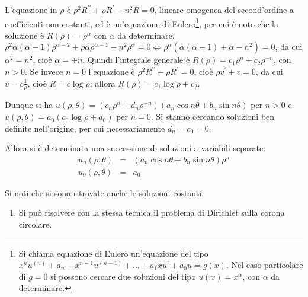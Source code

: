 \documentclass{article}
\begin{document}
L'equazione in $\rho $ \`{e} $\rho ^{2}R^{\prime \prime }+\rho R^{\prime
}-n^{2}R=0$, lineare omogenea del second'ordine a coefficienti non costanti,
ed \`{e} un'equazione di Eulero\footnote{%
Si chiama equazione di Eulero un'equazione del tipo $x^{n}u^{\left( n\right)
}+a_{n-1}x^{n-1}u^{\left( n-1\right) }+...+a_{1}xu^{\prime }+a_{0}u=g\left(
x\right) $. Nel caso particolare di $g=0$ si possono cercare due soluzioni
del tipo $u\left( x\right) =x^{\alpha }$, con $\alpha $ da determinare.},
per cui \`{e} noto che la soluzione \`{e} $R\left( \rho \right) =\rho
^{\alpha }$ con $\alpha $ da determinare. $\rho ^{2}\alpha \left( \alpha
-1\right) \rho ^{\alpha -2}+\rho \alpha \rho ^{\alpha -1}-n^{2}\rho ^{\alpha
}=0\Longleftrightarrow \rho ^{\alpha }\left( \alpha \left( \alpha -1\right)
+\alpha -n^{2}\right) =0$, da cui $\alpha ^{2}=n^{2}$, cio\`{e} $\alpha =\pm
n$. Quindi l'integrale generale \`{e} $R\left( \rho \right) =c_{1}\rho
^{n}+c_{2}\rho ^{-n}$, con $n>0$. Se invece $n=0$ l'equazione \`{e} $\rho
^{2}R^{\prime \prime }+\rho R^{\prime }=0$, cio\`{e} $\rho v^{\prime }+v=0$,
da cui $v=c\frac{1}{\rho }$, cio\`{e} $R=c\log \rho $; allora $R\left( \rho
\right) =c_{1}\log \rho +c_{2}$.

Dunque si ha $u\left( \rho ,\theta \right) =\left( c_{n}\rho ^{n}+d_{n}\rho
^{-n}\right) \left( a_{n}\cos n\theta +b_{n}\sin n\theta \right) $ per $n>0$
e $u\left( \rho ,\theta \right) =a_{0}\left( c_{0}\log \rho +d_{0}\right) $
per $n=0$. Si stanno cercando soluzioni ben definite nell'origine, per cui
necessariamente $d_{n}=c_{0}=0$.

Allora si \`{e} determinata una successione di soluzioni a variabili
separate:%
\begin{eqnarray*}
u_{n}\left( \rho ,\theta \right) &=&\left( a_{n}\cos n\theta +b_{n}\sin
n\theta \right) \rho ^{n} \\
u_{0}\left( \rho ,\theta \right) &=&a_{0}
\end{eqnarray*}

Si noti che si sono ritrovate anche le soluzioni costanti.

\begin{enumerate}
\item Si pu\`{o} risolvere con la stessa tecnica il problema di Dirichlet
sulla corona circolare.
\end{enumerate}
\end{document}
